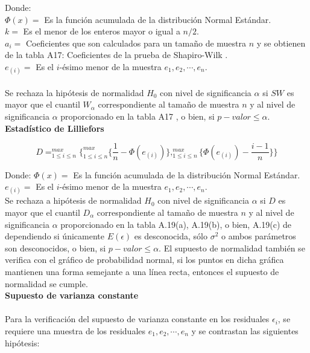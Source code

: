 Donde:\\
$\Phi (x) =$ Es la función acumulada de la distribución Normal Estándar.\\
$k =$ Es el menor de los enteros mayor o igual a $n/2$.\\
$a_i =$ Coeficientes que son calculados para un tamaño de muestra $n$ y se obtienen de la tabla A17: Coeficientes de la prueba de Shapiro-Wilk \parencite{conover-1999}.\\
$e_{(i)} =$ Es el $i$-ésimo menor de la muestra $e_1, e_2, \cdots , e_n$.\\\\
Se rechaza la hipótesis de normalidad $H_0$ con nivel de significancia $\alpha$ si $SW$ es mayor que el cuantil $W_{\alpha}$ correspondiente al tamaño de muestra $n$ y al nivel de significancia $\alpha$ proporcionado en la tabla A17 \parencite{conover-1999}, o bien, si $p-valor \leq \alpha$.\\



\textbf{Estadístico de Lilliefors}

\begin{center}
	$$D = ^{max}_{1\leq i \leq n}\lbrace ^{max}_{1\leq i \leq n} \lbrace \frac{1}{n} - \Phi (e_{(i)}) \rbrace , ^{max}_{1 \leq i \leq n} \lbrace \Phi (e_{(i)}) - \frac{i-1}{n} \rbrace   \rbrace$$
\end{center}



Donde:
$\Phi (x) =$  Es la función acumulada de la distribución Normal Estándar.\\
$e_{(i)} =$ Es el $i$-ésimo menor de la muestra $e_1, e_2, \cdots , e_n$.\\

Se rechaza a hipótesis de normalidad $H_0$ con nivel de significancia $\alpha$ si $D$ es mayor que el cuantil $D_\alpha$ correspondiente al tamaño de muestra $n$ y al nivel de significancia $\alpha$ proporcionado en la tabla A.19(a), A.19(b), o bien, A.19(c) de \textcite{daniel-1990} dependiendo si únicamente $E(\epsilon)$ es desconocida, sólo $\sigma ^2$ o ambos parámetros son desconocidos, o bien, si $p-valor \leq \alpha$. El supuesto de normalidad también se verifica con el gráfico de probabilidad normal, si los puntos en dicha gráfica mantienen una forma semejante a una línea recta, entonces el supuesto de normalidad se cumple.\\



\textbf{Supuesto de varianza constante}\\\\
Para la verificación del supuesto de varianza constante en los residuales $\epsilon_i$, se requiere una muestra de los residuales $e_1, e_2, \cdots , e_n$ y se contrastan las siguientes hipótesis:\\

